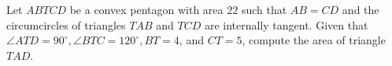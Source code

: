 Let $A B T C D$ be a convex pentagon with area $22$ such that $A B=C D$ and the circumcircles of triangles $T A B$ and $T C D$ are internally tangent. Given that $\angle A T D=90^{\circ}, \angle B T C=120^{\circ}, B T=4$, and $C T=5$, compute the area of triangle $T A D$.